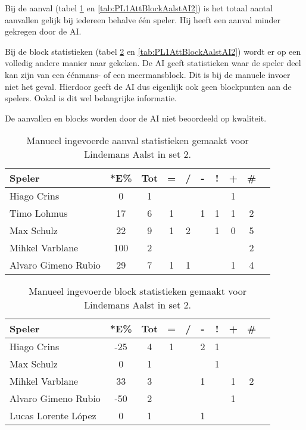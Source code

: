 Bij de aanval (tabel \ref{tab:PL1AttAalstMan2} en \ref{tab:PL1AttBlockAalstAI2}) is het totaal aantal aanvallen gelijk bij iedereen behalve één speler. Hij heeft een aanval minder gekregen door de AI. 

Bij de block statistieken (tabel \ref{tab:PL1BlockAalstMan2} en \ref{tab:PL1AttBlockAalstAI2}) wordt er op een volledig andere manier naar gekeken. De AI geeft statistieken waar de speler deel kan zijn van een éénmans- of een meermansblock. Dit is bij de manuele invoer niet het geval. Hierdoor geeft de AI dus eigenlijk ook geen blockpunten aan de spelers. Ookal is dit wel belangrijke informatie.

De aanvallen en blocks worden door de AI niet beoordeeld op kwaliteit.

\begin{table}[ht!]
  \centering
  \scriptsize
    \begin{tabular}{|l|c|c|c|c|c|c|c|c|c|}
      \hline
      \textbf{Speler} & *E\% & Tot & = & / & - & ! & + & \# \\ \hline
      Hiago Crins  & 0 & 1 &  &  &  &  & 1 &  \\ 
      Timo Lohmus  & 17 & 6 & 1 &  & 1 & 1 & 1 & 2 \\ 
      Max Schulz  & 22 & 9 & 1 & 2 &  & 1 & 0 & 5\\
      Mihkel Varblane  & 100 & 2 &  &  &  &  &  & 2 \\ 
      Alvaro Gimeno Rubio & 29 & 7 & 1 & 1 &  &  & 1 & 4 \\ \hline 
  \end{tabular}
\caption[Manueel ingevoerde aanval statistieken gemaakt Lindemans Aalst in set 2]{\label{tab:PL1AttAalstMan2}Manueel ingevoerde aanval statistieken gemaakt voor Lindemans Aalst in set 2.}
\end{table}

\begin{table}[ht!]
  \centering
  \scriptsize
    \begin{tabular}{|l|c|c|c|c|c|c|c|c|c|}
      \hline
      \textbf{Speler} & *E\% & Tot & = & / & - & ! & + & \# \\ \hline
      Hiago Crins & -25 & 4 & 1 &  & 2 & 1 &  &  \\ 
      Max Schulz & 0 & 1 &  &  &  & 1 &  & \\
      Mihkel Varblane & 33 & 3 &  &  & 1 &  & 1 & 2 \\
      Alvaro Gimeno Rubio & -50 & 2 &  & &  &  & 1 &  \\
      Lucas Lorente López & 0 & 1 &  &  & 1 &  &  &  \\ \hline
  \end{tabular}
\caption[Manueel ingevoerde block statistieken gemaakt Lindemans Aalst in set 2]{\label{tab:PL1BlockAalstMan2}Manueel ingevoerde block statistieken gemaakt voor Lindemans Aalst in set 2.}
\end{table}

